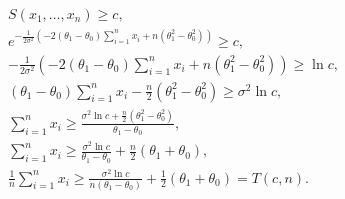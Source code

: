 \documentclass[12pt]{article}
\begin{document}
    \begin{gather*}
        S(x_1, \dots, x_n) \ge c , \\
        e^{- \frac{1}{2 \sigma^2} \left ( - 2 \left ( \theta_1 - \theta_0 \right ) \sum_{i=1}^n x_i + n \left ( \theta_1^2 - \theta_0^2 \right ) \right )} \ge c , \\
        - \frac{1}{2 \sigma^2} \left ( - 2 \left ( \theta_1 - \theta_0 \right ) \sum_{i=1}^n x_i + n \left ( \theta_1^2 - \theta_0^2 \right ) \right ) \ge \ln c , \\
        \left ( \theta_1 - \theta_0 \right ) \sum_{i=1}^n x_i - \frac{n}{2} \left ( \theta_1^2 - \theta_0^2 \right ) \ge \sigma^2 \ln c , \\
        \sum_{i=1}^n x_i \ge \frac{\sigma^2 \ln c + \frac{n}{2} \left ( \theta_1^2 - \theta_0^2 \right )}{\theta_1 - \theta_0} , \\
        \sum_{i=1}^n x_i \ge \frac{\sigma^2 \ln c}{\theta_1 - \theta_0} + \frac{n}{2} \left ( \theta_1 + \theta_0 \right ) , \\
        \frac{1}{n} \sum_{i=1}^n x_i \ge \frac{\sigma^2 \ln c}{n \left ( \theta_1 - \theta_0 \right )} + \frac{1}{2} \left ( \theta_1 + \theta_0 \right ) = T(c, n).
    \end{gather*}
\end{document}
